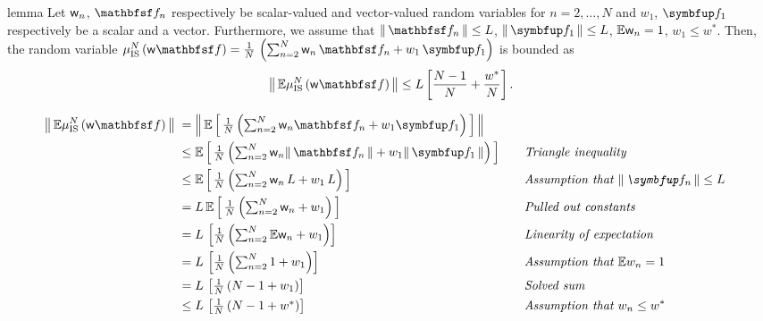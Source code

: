 \begin{theoremEnd}{lemma}\label{thm:is_bound}
Let \(\mathsf{w}_n\), \(\rvvf_n\) respectively be scalar-valued and vector-valued random variables for \(n = 2, \ldots, N\) and \(w_1\), \(\vf_1\) respectively be a scalar and a vector.
Furthermore, we assume that \(\norm{\rvvf_n}\leq L\), \(\norm{\vf_1} \leq L\), \(\mathbb{E}\mathsf{w}_n = 1\), \(w_1 \leq w^*\).
Then, the random variable
  \(
    \mu_{\mathrm{IS}}^N\left(\rvw\rvvf\right) = \frac{1}{N}\,\left(\sum^{N}_{n=2} \rvw_n\,\rvvf_n  + w_1\,\vf_1\right)
  \)
  is bounded as
  \begin{align*}
    \norm{
    \mathbb{E}\mu_{\mathrm{IS}}^N\left(\rvw\rvvf\right)
    }
    \leq
    L \left[ \frac{N - 1}{N} + \frac{w^*}{N} \right].
  \end{align*}
\end{theoremEnd}
\begin{proofEnd}
  \begin{alignat}{2}
    \norm{
      \mathbb{E}{
        \mu^{N}_{\mathrm{IS}}\left(\rvw\rvvf\right)
      }
    }
    &\;=
    \norm{
      \E{\textstyle
        \frac{1}{N} \left( \sum_{n=2}^N \rvw_n \rvvf_n + w_1 \vf_1 \right)
      }
    }
    \nonumber
    \\
    &\;\leq
    \E{\textstyle
      \frac{1}{N} \left( \sum_{n=2}^N \rvw_n \norm{\rvvf_n} + w_1 \norm{\vf_1} \right)
    }
    \nonumber
    &&\quad\text{\textit{Triangle inequality}}
    \\
    &\;\leq
    \E{\textstyle
      \frac{1}{N} \left( \sum_{n=2}^N \rvw_n \,L + w_1 \,L \right)
    }
    \nonumber
    &&\quad\text{\textit{Assumption that \(\norm{\vf_n} \leq L\)}}
    \\
    &\;=
    L\,\E{\textstyle
      \frac{1}{N} \left( \sum_{n=2}^N \rvw_n  + w_1 \right)
    }
    \nonumber
    &&\quad\text{\textit{Pulled out constants}}
    \\
    &\;=
    L\,\left[\textstyle
      \frac{1}{N} \left( \sum_{n=2}^N \mathbb{E}\rvw_n  + w_1 \right)
    \right]
    \nonumber
    &&\quad\text{\textit{Linearity of expectation}}
    \\
    &\;=
    L\,\left[\textstyle
      \frac{1}{N} \left( \sum_{n=2}^N 1  + w_1 \right)
    \right]
    \nonumber
    &&\quad\text{\textit{Assumption that \(\mathbb{E}w_n = 1\)}}
    \\
    &\;=
    L\,\left[\textstyle
      \frac{1}{N} \left( N-1  + w_1 \right)
    \right]
    \nonumber
    &&\quad\text{\textit{Solved sum}}
    \\
    &\;\leq
    L\,\left[\textstyle
      \frac{1}{N} \left( N-1  + w^* \right)
    \right]
    \nonumber
    &&\quad\text{\textit{Assumption that \(w_n \leq w^*\)}}
  \end{alignat}
\end{proofEnd}

